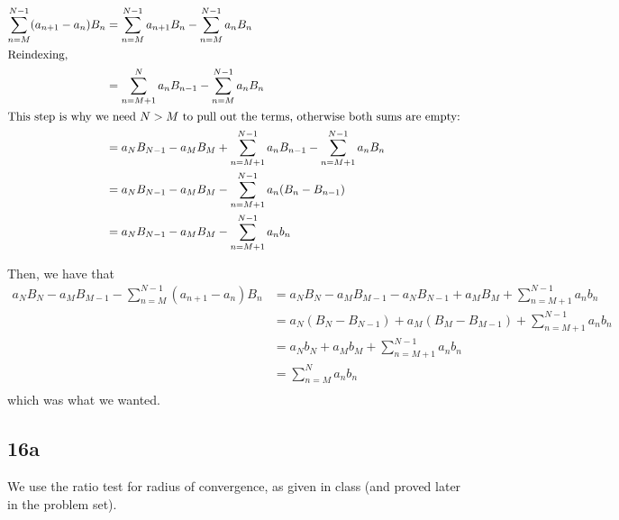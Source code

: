 \documentclass[12pt,letterpaper]{article}
\theoremstyle{definition}
\begin{document}
\begin{align*}
  \sum_{n=M}^{N-1}(a_{n+1}-a_n)B_n &= \sum_{n=M}^{N-1} a_{n+1}B_n - \sum_{n=M}^{N-1} a_nB_n \\
  \intertext{Reindexing,}
                                   &= \sum_{n=M+1}^N a_nB_{n-1} - \sum_{n=M}^{N-1} a_nB_n \\
  \intertext{This step is why we need $N > M$ to pull out the terms, otherwise both sums are empty:}
                                   &= a_NB_{N-1} - a_MB_M + \sum_{n=M+1}^{N-1} a_nB_{n-1} - \sum_{n=M+1}^{N-1} a_nB_n \\
                                   &= a_NB_{N-1} - a_MB_M - \sum_{n=M+1}^{N-1} a_n(B_{n} - B_{n-1}) \\
                                   &= a_NB_{N-1} - a_MB_M - \sum_{n=M+1}^{N-1} a_nb_n \\
\end{align*}

Then, we have that
\begin{align*}
  a_NB_N - a_MB_{M-1} - \sum_{n=M}^{N-1}(a_{n+1} - a_n)B_n &= a_NB_N - a_MB_{M-1} - a_NB_{N-1} + a_MB_M + \sum_{n=M+1}^{N-1} a_nb_n \\
                                                           &= a_N(B_N - B_{N-1}) + a_M(B_M - B_{M-1}) + \sum_{n=M+1}^{N-1} a_nb_n \\
                                                           &= a_Nb_N + a_Mb_M + \sum_{n=M+1}^{N-1} a_nb_n \\
                                                           &= \sum_{n=M}^{N} a_nb_n \\
\end{align*}
which was what we wanted.

\subsection*{16a}

We use the ratio test for radius of convergence, as given in class (and proved later in the problem set).
\end{document}
